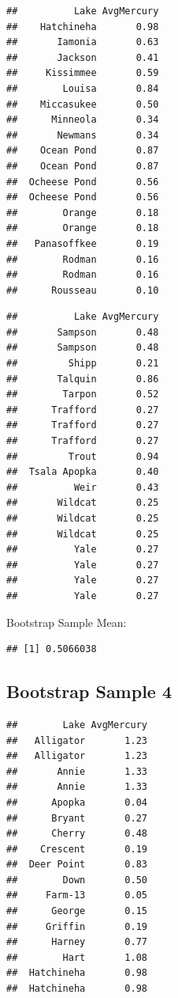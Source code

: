 \documentclass[]{book}
\newenvironment{Shaded}{\begin{snugshade}}{\end{snugshade}}
\newcommand{\KeywordTok}[1]{\textcolor[rgb]{0.13,0.29,0.53}{\textbf{#1}}}
\newcommand{\OperatorTok}[1]{\textcolor[rgb]{0.81,0.36,0.00}{\textbf{#1}}}
\newcommand{\NormalTok}[1]{#1}
\begin{document}
\begin{verbatim}
##          Lake AvgMercury
##    Hatchineha       0.98
##       Iamonia       0.63
##       Jackson       0.41
##     Kissimmee       0.59
##        Louisa       0.84
##    Miccasukee       0.50
##      Minneola       0.34
##       Newmans       0.34
##    Ocean Pond       0.87
##    Ocean Pond       0.87
##  Ocheese Pond       0.56
##  Ocheese Pond       0.56
##        Orange       0.18
##        Orange       0.18
##   Panasoffkee       0.19
##        Rodman       0.16
##        Rodman       0.16
##      Rousseau       0.10
\end{verbatim}

\begin{verbatim}
##          Lake AvgMercury
##       Sampson       0.48
##       Sampson       0.48
##         Shipp       0.21
##       Talquin       0.86
##        Tarpon       0.52
##      Trafford       0.27
##      Trafford       0.27
##      Trafford       0.27
##         Trout       0.94
##  Tsala Apopka       0.40
##          Weir       0.43
##       Wildcat       0.25
##       Wildcat       0.25
##       Wildcat       0.25
##          Yale       0.27
##          Yale       0.27
##          Yale       0.27
##          Yale       0.27
\end{verbatim}

Bootstrap Sample Mean:

\begin{Shaded}
\end{Shaded}

\begin{verbatim}
## [1] 0.5066038
\end{verbatim}

\subsection{Bootstrap Sample 4}\label{bootstrap-sample-4}

\begin{verbatim}
##        Lake AvgMercury
##   Alligator       1.23
##   Alligator       1.23
##       Annie       1.33
##       Annie       1.33
##      Apopka       0.04
##      Bryant       0.27
##      Cherry       0.48
##    Crescent       0.19
##  Deer Point       0.83
##        Down       0.50
##     Farm-13       0.05
##      George       0.15
##     Griffin       0.19
##      Harney       0.77
##        Hart       1.08
##  Hatchineha       0.98
##  Hatchineha       0.98
\end{verbatim}
\end{document}
